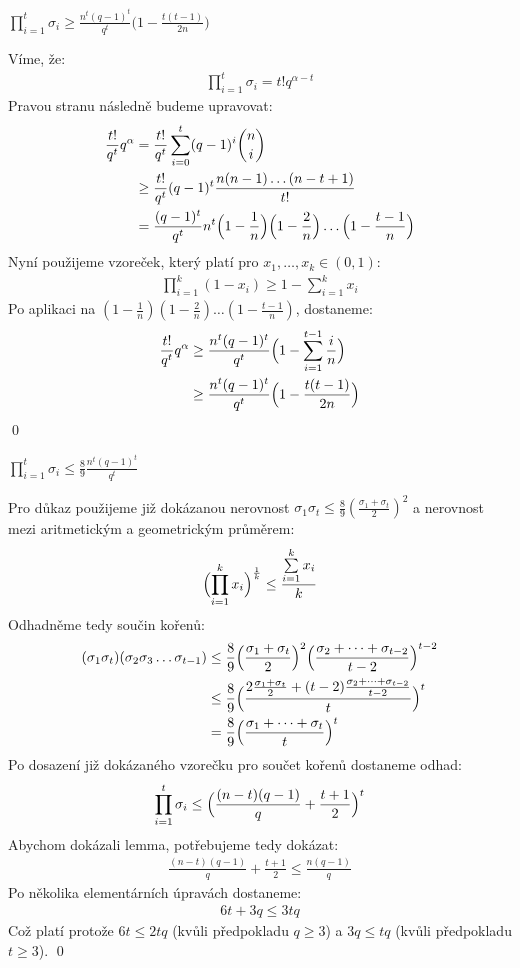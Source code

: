 \lm $\prod\limits_{i = 1}^t \sigma_i \geq \frac{n^t (q-1)^t}{q^t}\bigl(1 - \frac{t(t-1)}{2n}\bigr)$

\dk Víme, že:
\begin{align*}
\prod\limits_{i = 1}^t \sigma_i = t!q^{\alpha-t}
\end{align*}
Pravou stranu následně budeme upravovat:
\begin{align*}
\frac{t!}{q^t}q^\alpha &= \frac{t!}{q^t}\sum\limits_{i = 0}^{t}(q - 1)^i{n \choose i} \\
&\geq \frac{t!}{q^t} (q - 1)^t \frac{n(n-1)\dots(n-t+1)}{t!}  \\
&= \frac{(q-1)^t}{q^t} n^t \Bigl(1 - \frac{1}{n}\Bigr)\Bigl(1 - \frac{2}{n}\Bigr)\dots\Bigl(1 - \frac{t-1}{n}\Bigr)
\end{align*}
Nyní použijeme vzoreček, který platí pro $x_1,\dots,x_k \in (0,1)$:
\begin{align*}
\prod\limits_{i=1}^{k} (1 - x_i) \geq 1 - \sum\limits_{i=1}^{k} x_i
\end{align*}
Po aplikaci na $(1 - \frac{1}{n})(1 - \frac{2}{n})\dots(1 - \frac{t-1}{n})$, dostaneme:
\begin{align*}
\frac{t!}{q^t}q^\alpha &\geq \frac{n^t (q-1)^t}{q^t}\Bigl(1 - \sum\limits_{i=1}^{t-1} \frac{i}{n}\Bigr) \\
&\geq \frac{n^t (q-1)^t}{q^t}\Bigl(1 - \frac{t(t-1)}{2n}\Bigr) 
\end{align*}
\qed

\lm $\prod\limits_{i = 1}^t \sigma_i \leq \frac{8}{9}\frac{n^t(q-1)^t}{q^t}$

\dk Pro důkaz použijeme již dokázanou nerovnost $\sigma_1\sigma_t \leq \frac{8}{9}(\frac{\sigma_1+\sigma_t}{2})^2$ a nerovnost mezi aritmetickým a geometrickým průměrem:
\begin{align*}
\Bigl(\prod\limits_{i=1}^k x_i \Bigr)^{\frac{1}{k}} \leq \frac{\sum\limits_{i=1}^k x_i}{k}
\end{align*}
Odhadněme tedy součin kořenů:
\begin{align*}
(\sigma_1\sigma_t)(\sigma_2\sigma_3\dots\sigma_{t-1}) &\leq \frac{8}{9}\Bigl(\frac{\sigma_1+\sigma_t}{2}\Bigr)^2\Bigl(\frac{\sigma_2 + \dots + \sigma_{t-2}}{t-2}\Bigr)^{t-2} \\
&\leq \frac{8}{9} \Bigl(\frac{2\frac{\sigma_1 + \sigma_t}{2} + (t-2)\frac{\sigma_2 + \dots + \sigma_{t-2}}{t-2}}{t}\Bigr)^t \\
&=\frac{8}{9}\Bigl(\frac{\sigma_1 + \dots + \sigma_t}{t}\Bigr)^t
\end{align*}
Po dosazení již dokázaného vzorečku pro součet kořenů dostaneme odhad:
\begin{align*}
\prod\limits_{i = 1}^{t} \sigma_i \leq \Bigl(\frac{(n-t)(q-1)}{q} + \frac{t+1}{2}\Bigr)^t
\end{align*}
Abychom dokázali lemma, potřebujeme tedy dokázat:
\begin{align*}
\frac{(n-t)(q-1)}{q} + \frac{t+1}{2} \leq \frac{n(q-1)}{q}
\end{align*}
Po několika elementárních úpravách dostaneme:
\begin{align*}
6t + 3q \leq 3tq
\end{align*}
Což platí protože $6t \leq 2tq$ (kvůli předpokladu $q \geq 3$) a $3q \leq tq$ (kvůli předpokladu $t \geq 3$).
\qed

